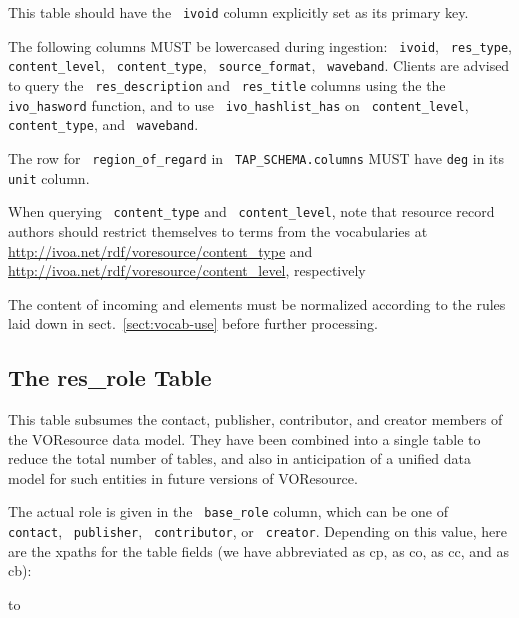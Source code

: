 \documentclass[11pt,a4paper]{ivoa}
\newcommand{\rtent}[1]{\texttt{\color{rtcolor} #1}}
\newcommand{\tapent}[1]{\texttt{\color{tapcolor} #1}}
\begin{document}


This table should have the \rtent{ivoid} column explicitly set
as its primary key.

The following columns MUST be lowercased during ingestion:
\rtent{ivoid}, \rtent{res\_type}, \rtent{content\_level},
\rtent{content\_type}, \rtent{source\_format},
\rtent{waveband}.
Clients are advised to query the \rtent{res\_description} and
\rtent{res\_title}  columns
using the the \rtent{ivo\_hasword} function, and to use
\rtent{ivo\_hashlist\_has} on \rtent{content\_level},
\rtent{content\_type}, and
\rtent{waveband}.

The row for \rtent{region\_of\_regard} in  
\tapent{TAP\_SCHEMA.columns} MUST have \texttt{deg} in its
\tapent{unit} column.

When querying \rtent{content\_type} and \rtent{content\_level},
note that resource record authors should restrict themselves to terms
from the vocabularies at
\url{http://ivoa.net/rdf/voresource/content_type} and
\url{http://ivoa.net/rdf/voresource/content_level}, respectively

The content of incoming  and 
elements must be normalized according to the rules laid down in
sect.~\ref{sect:vocab-use} before further processing.


\subsection{The res\_role Table}

\label{table_res_role}

This table subsumes the contact, publisher, contributor, 
and creator members of the
VOResource data model.  They have been combined into a single table to
reduce the total number of tables, and also in anticipation of a unified
data model for such entities in future versions of VOResource.

The actual role is given in the \rtent{base\_role} column, which
can be one of \rtent{contact}, \rtent{publisher}, \rtent{contributor}, or
\rtent{creator}.  Depending on this value, here are the xpaths
for the table fields (we have abbreviated
as cp,  as co,  
as cc,
and  as cb):

\vspace{5pt}
\hbox to
\vskip5pt
\end{document}
